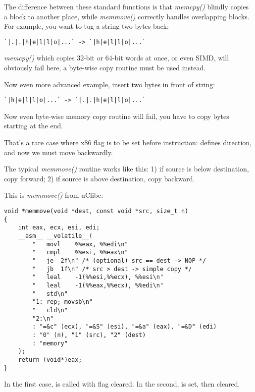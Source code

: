 \label{memmove_and_DF}

The difference between these standard functions is that \emph{memcpy()} blindly copies a block to another place,
while \emph{memmove()} correctly handles overlapping blocks.
For example, you want to tug a string two bytes back:

\begin{lstlisting}
`|.|.|h|e|l|l|o|...` -> `|h|e|l|l|o|...`
\end{lstlisting}

\emph{memcpy()} which copies 32-bit or 64-bit words at once, or even \ac{SIMD},
will obviously fail here, a byte-wise copy routine must be used instead.

Now even more advanced example, insert two bytes in front of string:

\begin{lstlisting}
`|h|e|l|l|o|...` -> `|.|.|h|e|l|l|o|...`
\end{lstlisting}

Now even byte-wise memory copy routine will fail, you have to copy bytes starting at the end.

That's a rare case where  x86 flag is to be set before  instruction:
 defines direction, and now we must move backwardly.

The typical \emph{memmove()} routine works like this:
1) if source is below destination, copy forward;
2) if source is above destination, copy backward.

This is \emph{memmove()} from uClibc:

\begin{lstlisting}[style=customc]
void *memmove(void *dest, const void *src, size_t n)
{
	int eax, ecx, esi, edi;
	__asm__ __volatile__(
		"	movl	%%eax, %%edi\n"
		"	cmpl	%%esi, %%eax\n"
		"	je	2f\n" /* (optional) src == dest -> NOP */
		"	jb	1f\n" /* src > dest -> simple copy */
		"	leal	-1(%%esi,%%ecx), %%esi\n"
		"	leal	-1(%%eax,%%ecx), %%edi\n"
		"	std\n"
		"1:	rep; movsb\n"
		"	cld\n"
		"2:\n"
		: "=&c" (ecx), "=&S" (esi), "=&a" (eax), "=&D" (edi)
		: "0" (n), "1" (src), "2" (dest)
		: "memory"
	);
	return (void*)eax;
}
\end{lstlisting}

In the first case,  is called with  flag cleared.
In the second,  is set, then cleared.

